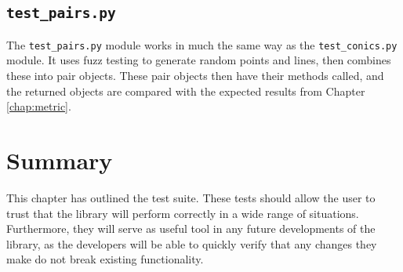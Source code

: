 \subsection{\texttt{test\_pairs.py}}

The \texttt{test\_pairs.py} module works in much the same way as the \texttt{test\_conics.py} module.
It uses fuzz testing to generate random points and lines, then combines these into pair objects.
These pair objects then have their methods called, and the returned objects are compared with the expected results from Chapter \ref{chap:metric}.

\section{Summary}

This chapter has outlined the \pygeom test suite.
These tests should allow the user to trust that the library will perform correctly in a wide range of situations.
Furthermore, they will serve as useful tool in any future developments of the library, as the developers will be able to quickly verify that any changes they make do not break existing functionality.

